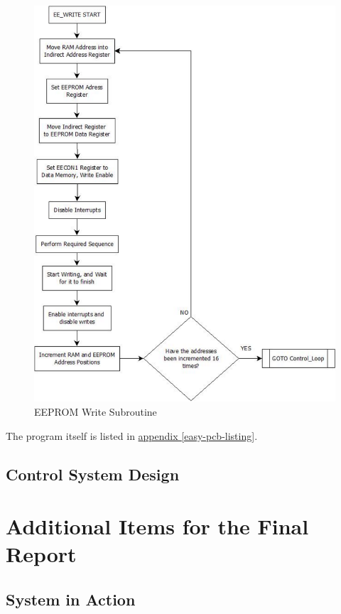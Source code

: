 \documentclass[10pt, twocolumn]{article}
\begin{document}
\begin{figure}
	\centering
	\includegraphics[width=\columnwidth]{user-interface-flowchart-4.pdf}
	\caption{EEPROM Write Subroutine}
	\label{user-interface-flowchart-4}
\end{figure}

The program itself is listed in
\hyperref[easy-pcb-listing]{appendix \ref{easy-pcb-listing}}.

\subsection{Control System Design}

\section{Additional Items for the Final Report}

\subsection{System in Action}
\end{document}
